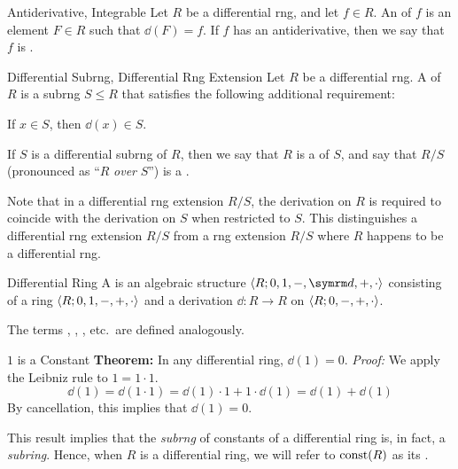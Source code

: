 \begin{dfnbox}{Antiderivative, Integrable}
	Let $R$ be a differential rng, and let $f \in R$. An  of $f$ is an element $F \in R$ such that $\dd(F) = f$. If $f$ has an antiderivative, then we say that $f$ is .
\end{dfnbox}

\begin{dfnbox}{Differential Subrng, Differential Rng Extension}
	Let $R$ be a differential rng. A  of $R$ is a subrng $S \le R$ that satisfies the following additional requirement:
	\begin{dfnitems}
		\item {} If $x \in S$, then $\dd(x) \in S$.
	\end{dfnitems}
	If $S$ is a differential subrng of $R$, then we say that $R$ is a  of $S$, and say that $R/S$ (pronounced as ``$R$ \textit{over} $S$'') is a .
\end{dfnbox}

Note that in a differential rng extension $R/S$, the derivation on $R$ is required to coincide with the derivation on $S$ when restricted to $S$. This distinguishes a differential rng extension $R/S$ from a rng extension $R/S$ where $R$ happens to be a differential rng.

\begin{dfnbox}{Differential Ring}
	A  is an algebraic structure $\alg{R; 0, 1, -, \dd, +, \cdot}$ consisting of a ring ${\langle {R; 0, 1, -, +, \cdot} \rangle}$ and a derivation $\dd: R \to R$ on ${\langle {R; 0, -, +, \cdot} \rangle}$.
\end{dfnbox}

The terms , , , etc.\ are defined analogously.

\begin{thmbox}{$1$ is a Constant}
	\textbf{Theorem:} In any differential ring, $\dd(1) = 0$.
\tcblower
	\textit{Proof:} We apply the Leibniz rule to $1 = 1 \cdot 1$.
	\[ \dd(1) = \dd(1 \cdot 1) = \dd(1) \cdot 1 + 1 \cdot \dd(1) = \dd(1) + \dd(1) \]
	By cancellation, this implies that $\dd(1) = 0$.
\end{thmbox}

This result implies that the \textit{subrng} of constants of a differential ring is, in fact, a \textit{subring}. Hence, when $R$ is a differential ring, we will refer to $\operatorname{const}(R)$ as its .


